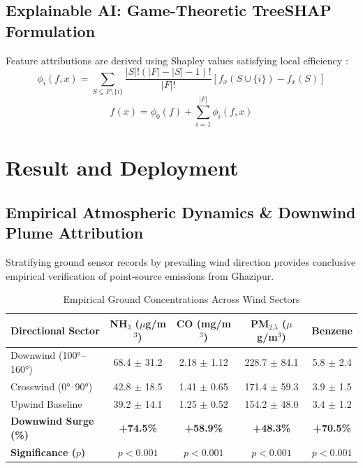 \documentclass[conference]{IEEEtran}
\begin{document}
\subsection{Explainable AI: Game-Theoretic TreeSHAP Formulation}
Feature attributions are derived using Shapley values satisfying local efficiency \cite{lundberg2020local}:
\begin{equation}
\phi_i(f, x) = \sum_{S \subseteq F \setminus \{i\}} \frac{|S|!(|F| - |S| - 1)!}{|F|!} \left[ f_x(S \cup \{i\}) - f_x(S) \right]
\end{equation}
\begin{equation}
f(x) = \phi_0(f) + \sum_{i=1}^{|F|} \phi_i(f, x)
\end{equation}

\section{Result and Deployment}
\subsection{Empirical Atmospheric Dynamics \& Downwind Plume Attribution}
Stratifying ground sensor records by prevailing wind direction provides conclusive empirical verification of point-source emissions from Ghazipur.

\begin{table}[htbp]
\caption{Empirical Ground Concentrations Across Wind Sectors}
\begin{center}
\begin{tabular}{lcccc}
\toprule
\textbf{Directional Sector} & \textbf{NH$_3$ ($\mu$g/m$^3$)} & \textbf{CO (mg/m$^3$)} & \textbf{PM$_{2.5}$ ($\mu$g/m$^3$)} & \textbf{Benzene} \\
\midrule
Downwind (100°–160°) & 68.4 $\pm$ 31.2 & 2.18 $\pm$ 1.12 & 228.7 $\pm$ 84.1 & 5.8 $\pm$ 2.4 \\
Crosswind (0°–90°) & 42.8 $\pm$ 18.5 & 1.41 $\pm$ 0.65 & 171.4 $\pm$ 59.3 & 3.9 $\pm$ 1.5 \\
Upwind Baseline & 39.2 $\pm$ 14.1 & 1.25 $\pm$ 0.52 & 154.2 $\pm$ 48.0 & 3.4 $\pm$ 1.2 \\
\midrule
\textbf{Downwind Surge (\%)} & \textbf{+74.5\%} & \textbf{+58.9\%} & \textbf{+48.3\%} & \textbf{+70.5\%} \\
\textbf{Significance ($p$)} & \textbf{$p < 0.001$} & \textbf{$p < 0.001$} & \textbf{$p < 0.001$} & \textbf{$p < 0.001$} \\
\bottomrule
\end{tabular}
\label{tab:downwind}
\end{center}
\end{table}
\end{document}
